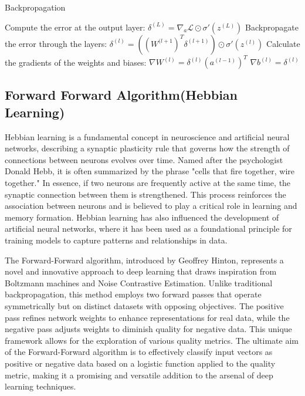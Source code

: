 \documentclass[nohyperref]{article}
\theoremstyle{plain}
\theoremstyle{definition}
\theoremstyle{remark}
\begin{document}
\begin{algorithm}[tb]
     \caption{Backpropagation}
   \label{alg:BP}

  \begin{algorithmic}
\STATE Compute the error at the output layer:
\STATE $\delta^{(L)} = \nabla_a \mathcal{L} \odot \sigma'(z^{(L)})$
    \STATE Backpropagate the error through the layers:
    \STATE $\delta^{(l)} = ((W^{(l+1})^T \delta^{(l+1)}) \odot \sigma'(z^{(l)})$
    \STATE Calculate the gradients of the weights and biases:
    \STATE $\nabla W^{(l)} = \delta^{(l)}(a^{(l-1)})^T$
    \STATE $\nabla b^{(l)} = \delta^{(l)}$
\ENDFOR    
\end{algorithmic}
\end{algorithm}



\subsection{Forward Forward Algorithm(Hebbian Learning)}
Hebbian learning is a fundamental concept in neuroscience and artificial neural networks, describing a synaptic plasticity rule that governs how the strength of connections between neurons evolves over time. Named after the psychologist Donald Hebb, it is often summarized by the phrase "cells that fire together, wire together." In essence, if two neurons are frequently active at the same time, the synaptic connection between them is strengthened. This process reinforces the association between neurons and is believed to play a critical role in learning and memory formation. Hebbian learning has also influenced the development of artificial neural networks, where it has been used as a foundational principle for training models to capture patterns and relationships in data.

The Forward-Forward algorithm\cite{hinton2022forward}, introduced by Geoffrey Hinton, represents a novel and innovative approach to deep learning that draws inspiration from Boltzmann machines and Noise Contrastive Estimation. Unlike traditional backpropagation, this method employs two forward passes that operate symmetrically but on distinct datasets with opposing objectives. The positive pass refines network weights to enhance representations for real data, while the negative pass adjusts weights to diminish quality for negative data. This unique framework allows for the exploration of various quality metrics. The ultimate aim of the Forward-Forward algorithm is to effectively classify input vectors as positive or negative data based on a logistic function applied to the quality metric, making it a promising and versatile addition to the arsenal of deep learning techniques.
\end{document}
